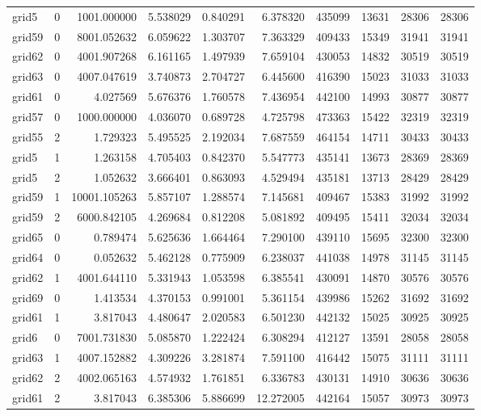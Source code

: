 \begin{longtable}{|l|r|r|r|r|r|r|r|r|r|}
grid5 & 0 & 1001.000000 & 5.538029 & 0.840291 & 6.378320 & 435099 & 13631 & 28306 & 28306 \\
grid59 & 0 & 8001.052632 & 6.059622 & 1.303707 & 7.363329 & 409433 & 15349 & 31941 & 31941 \\
grid62 & 0 & 4001.907268 & 6.161165 & 1.497939 & 7.659104 & 430053 & 14832 & 30519 & 30519 \\
grid63 & 0 & 4007.047619 & 3.740873 & 2.704727 & 6.445600 & 416390 & 15023 & 31033 & 31033 \\
grid61 & 0 & 4.027569 & 5.676376 & 1.760578 & 7.436954 & 442100 & 14993 & 30877 & 30877 \\
grid57 & 0 & 1000.000000 & 4.036070 & 0.689728 & 4.725798 & 473363 & 15422 & 32319 & 32319 \\
grid55 & 2 & 1.729323 & 5.495525 & 2.192034 & 7.687559 & 464154 & 14711 & 30433 & 30433 \\
grid5 & 1 & 1.263158 & 4.705403 & 0.842370 & 5.547773 & 435141 & 13673 & 28369 & 28369 \\
grid5 & 2 & 1.052632 & 3.666401 & 0.863093 & 4.529494 & 435181 & 13713 & 28429 & 28429 \\
grid59 & 1 & 10001.105263 & 5.857107 & 1.288574 & 7.145681 & 409467 & 15383 & 31992 & 31992 \\
grid59 & 2 & 6000.842105 & 4.269684 & 0.812208 & 5.081892 & 409495 & 15411 & 32034 & 32034 \\
grid65 & 0 & 0.789474 & 5.625636 & 1.664464 & 7.290100 & 439110 & 15695 & 32300 & 32300 \\
grid64 & 0 & 0.052632 & 5.462128 & 0.775909 & 6.238037 & 441038 & 14978 & 31145 & 31145 \\
grid62 & 1 & 4001.644110 & 5.331943 & 1.053598 & 6.385541 & 430091 & 14870 & 30576 & 30576 \\
grid69 & 0 & 1.413534 & 4.370153 & 0.991001 & 5.361154 & 439986 & 15262 & 31692 & 31692 \\
grid61 & 1 & 3.817043 & 4.480647 & 2.020583 & 6.501230 & 442132 & 15025 & 30925 & 30925 \\
grid6 & 0 & 7001.731830 & 5.085870 & 1.222424 & 6.308294 & 412127 & 13591 & 28058 & 28058 \\
grid63 & 1 & 4007.152882 & 4.309226 & 3.281874 & 7.591100 & 416442 & 15075 & 31111 & 31111 \\
grid62 & 2 & 4002.065163 & 4.574932 & 1.761851 & 6.336783 & 430131 & 14910 & 30636 & 30636 \\
grid61 & 2 & 3.817043 & 6.385306 & 5.886699 & 12.272005 & 442164 & 15057 & 30973 & 30973 \\

\end{longtable}
